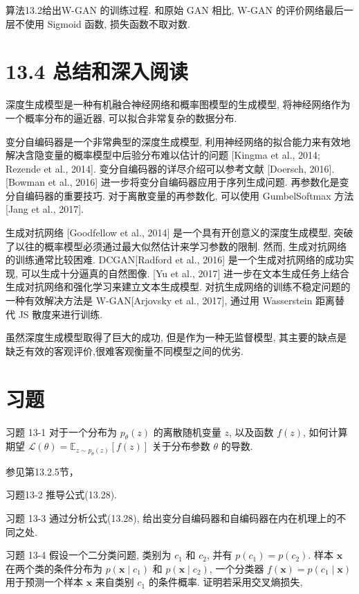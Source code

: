 \documentclass[10pt]{article}
\begin{document}
算法13.2给出W-GAN 的训练过程. 和原始 GAN 相比, W-GAN 的评价网络最后一层不使用 Sigmoid 函数, 损失函数不取对数.



\section*{13.4 总结和深入阅读}
深度生成模型是一种有机融合神经网络和概率图模型的生成模型, 将神经网络作为一个概率分布的逼近器, 可以拟合非常复杂的数据分布.

变分自编码器是一个非常典型的深度生成模型, 利用神经网络的拟合能力来有效地解决含隐变量的概率模型中后验分布难以估计的问题 [Kingma et al., 2014; Rezende et al., 2014]. 变分自编码器的详尽介绍可以参考文献 [Doersch, 2016]. [Bowman et al., 2016] 进一步将变分自编码器应用于序列生成问题. 再参数化是变分自编码器的重要技巧. 对于离散变量的再参数化, 可以使用 GumbelSoftmax 方法 [Jang et al., 2017].

生成对抗网络 [Goodfellow et al., 2014] 是一个具有开创意义的深度生成模型, 突破了以往的概率模型必须通过最大似然估计来学习参数的限制. 然而, 生成对抗网络的训练通常比较困难. DCGAN[Radford et al., 2016] 是一个生成对抗网络的成功实现, 可以生成十分逼真的自然图像. [Yu et al., 2017] 进一步在文本生成任务上结合生成对抗网络和强化学习来建立文本生成模型. 对抗生成网络的训练不稳定问题的一种有效解决方法是 W-GAN[Arjovsky et al., 2017], 通过用 Wasserstein 距离替代 JS 散度来进行训练.

虽然深度生成模型取得了巨大的成功, 但是作为一种无监督模型, 其主要的缺点是缺乏有效的客观评价,很难客观衡量不同模型之间的优劣.

\section*{习题}
习题 13-1 对于一个分布为 $p_{\theta}(z)$ 的离散随机变量 $z$, 以及函数 $f(z)$, 如何计算期望 $\mathcal{L}(\theta)=\mathbb{E}_{z \sim p_{\theta}(z)}[f(z)]$ 关于分布参数 $\theta$ 的导数.

参见第13.2.5节，

习题13-2 推导公式(13.28).

习题 13-3 通过分析公式(13.28), 给出变分自编码器和自编码器在内在机理上的不同之处.

习题 13-4 假设一个二分类问题, 类别为 $c_{1}$ 和 $c_{2}$, 并有 $p\left(c_{1}\right)=p\left(c_{2}\right)$. 样本 $\boldsymbol{x}$ 在两个类的条件分布为 $p\left(\boldsymbol{x} \mid c_{1}\right)$ 和 $p\left(\boldsymbol{x} \mid c_{2}\right)$, 一个分类器 $f(\boldsymbol{x})=p\left(c_{1} \mid \boldsymbol{x}\right)$ 用于预测一个样本 $\boldsymbol{x}$ 来自类别 $c_{1}$ 的条件概率. 证明若采用交叉熵损失,
\end{document}
